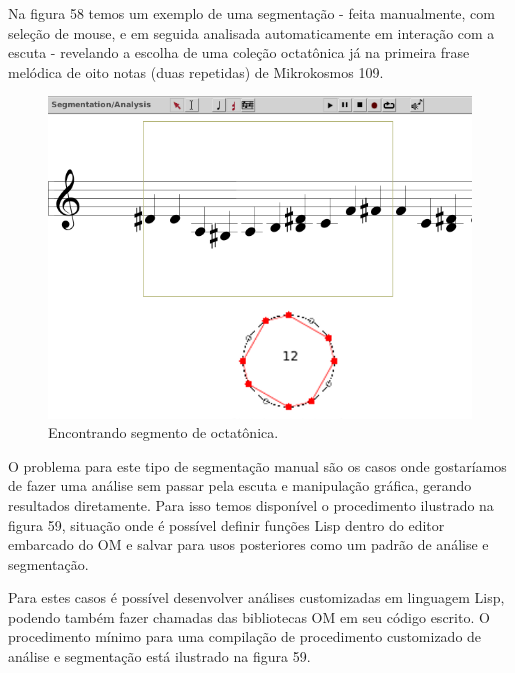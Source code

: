 \documentclass[
	12pt,				%
	openright,			%
	twoside,			%
	a4paper,			%
	english,			%
	french,				%
	spanish,			%
	brazil				%
	]{abntex2}
\begin{document}
Na figura 58 temos um exemplo de uma segmentação - feita manualmente, com seleção de mouse, e em seguida analisada automaticamente em interação com a escuta - revelando a escolha de uma coleção octatônica já na primeira frase melódica de oito notas (duas repetidas) de Mikrokosmos 109.


\begin{figure}[!h]
	\caption{\label{fig_grafico}Encontrando segmento de octatônica. }
	\begin{center}
	    \includegraphics[scale=0.3]{OM_settheory/SegmentaMikro109Octa.png}
	\end{center}
\end{figure}	

O problema para este tipo de segmentação manual são os casos onde gostaríamos de fazer uma análise sem passar pela escuta e manipulação gráfica, gerando resultados diretamente. Para isso temos disponível o procedimento ilustrado na figura 59, situação onde é possível definir funções Lisp dentro do editor embarcado do OM e salvar para usos posteriores como um padrão de análise e segmentação.

Para estes casos é possível desenvolver análises customizadas em linguagem Lisp, podendo também fazer chamadas das bibliotecas OM em seu código escrito. O procedimento mínimo para uma compilação de procedimento customizado de análise e segmentação está ilustrado na figura 59.
\end{document}
